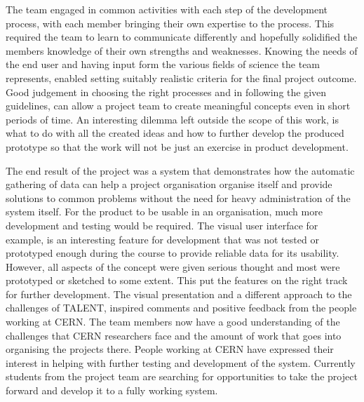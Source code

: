 \documentclass[english,12pt,a4paper,pdftex]{article}
\begin{document}
The team engaged in common activities with each step of the development process, with each member bringing their own expertise to the process. This required the team to learn to communicate differently and hopefully solidified the members knowledge of their own strengths and weaknesses. Knowing the needs of the end user and having input form the various fields of science the team represents, enabled setting suitably realistic criteria for the final project outcome. Good judgement in choosing the right processes and in following the given guidelines, can allow a project team to create meaningful concepts even in short periods of time. An interesting dilemma left outside the scope of this work, is what to do with all the created ideas and how to further develop the produced prototype so that the work will not be just an exercise in product development.

The end result of the project was a system that demonstrates how the automatic gathering of data can help a project organisation organise itself and provide solutions to common problems without the need for heavy administration of the system itself. For the product to be usable in an organisation, much more development and testing would be required. The visual user interface for example, is an interesting feature for development that was not tested or prototyped enough during the course to provide reliable data for its usability. However, all aspects of the concept were given serious thought and most were prototyped or sketched to some extent. This put the features on the right track for further development. The visual presentation and a different approach to the challenges of TALENT, inspired comments and positive feedback from the people working at CERN. The team members now have a good understanding of the challenges that CERN researchers face and the amount of work that goes into organising the projects there. People working at CERN have expressed their interest in helping with further testing and development of the system. Currently students from the project team are searching for opportunities to take the project forward and develop it to a fully working system.


\clearpage


\end{document}
